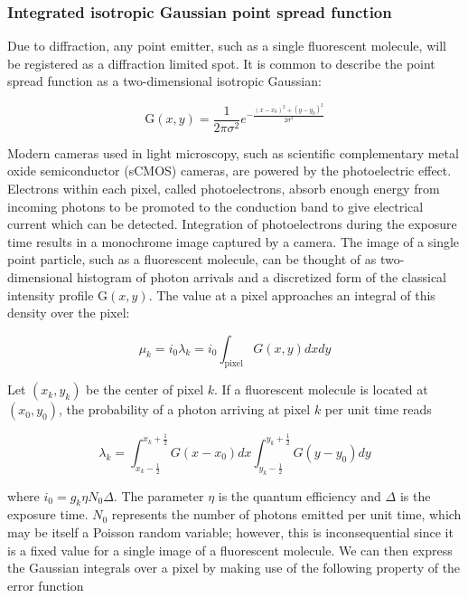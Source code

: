 \documentclass{ucetd}
\begin{document}
\subsubsection{Integrated isotropic Gaussian point spread function}

Due to diffraction, any point emitter, such as a single fluorescent molecule, will be registered as a diffraction limited spot. It is common to describe the point spread function as a two-dimensional isotropic Gaussian:

\begin{equation*}
\mathrm{G}(x,y) = \frac{1}{2\pi\sigma^{2}}e^{-\frac{(x-x_{0})^{2}+(y-y_{0})^{2}}{2\sigma^{2}}}
\end{equation*}

Modern cameras used in light microscopy, such as scientific complementary metal oxide semiconductor (sCMOS) cameras, are powered by the photoelectric effect. Electrons within each pixel, called photoelectrons, absorb enough energy from incoming photons to be promoted to the conduction band to give electrical current which can be detected. Integration of photoelectrons during the exposure time results in a monochrome image captured by a camera. The image of a single point particle, such as a fluorescent molecule, can be thought of as two-dimensional histogram of photon arrivals and a discretized form of the classical intensity profile $\mathrm{G}(x,y)$. The value at a pixel approaches an integral of this density over the pixel:

\begin{equation}
\mu_{k} = i_{0}\lambda_{k} = i_{0}\int_{\mathrm{pixel}} G(x,y)dxdy
\end{equation}

Let $(x_{k},y_{k})$ be the center of pixel $k$. If a fluorescent molecule is located at $(x_{0},y_{0})$, the probability of a photon arriving at pixel $k$ per unit time reads

\begin{equation*}
\lambda_{k} = \int_{x_{k}-\frac{1}{2}}^{x_{k}+\frac{1}{2}}G(x-x_{0})dx \int_{y_{k}-\frac{1}{2}}^{y_{k}+\frac{1}{2}} G(y-y_{0})dy
\end{equation*}

\vspace{0.2in}
where $i_{0} = g_{k}\eta N_{0}\Delta$. The parameter $\eta$ is the quantum efficiency and $\Delta$ is the exposure time. $N_{0}$ represents the number of photons emitted per unit time, which may be itself a Poisson random variable; however, this is inconsequential since it is a fixed value for a single image of a fluorescent molecule. We can then express the Gaussian integrals over a pixel by making use of the following property of the error function
\end{document}
